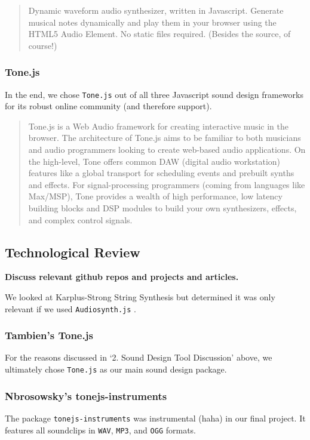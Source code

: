 \documentclass[12pt,a4paper]{article}
\newcommand{\code}{\texttt}
\newcommand{\lightcode}[1]{\colorbox{light-gray}{\texttt{#1}}}
\begin{document}
\begin{quote}
Dynamic waveform audio synthesizer, written in Javascript. Generate musical notes dynamically and play them in your browser using the HTML5 Audio Element. No static files required. (Besides the source, of course!) \cite{audiosynth}
\end{quote}


\subsubsection{Tone.js}
In the end, we chose \lightcode{Tone.js} out of all three Javascript sound design frameworks for its robust online community (and therefore support).

\begin{quote}
Tone.js is a Web Audio framework for creating interactive music in the browser. The architecture of Tone.js aims to be familiar to both musicians and audio programmers looking to create web-based audio applications. On the high-level, Tone offers common DAW (digital audio workstation) features like a global transport for scheduling events and prebuilt synths and effects. For signal-processing programmers (coming from languages like Max/MSP), Tone provides a wealth of high performance, low latency building blocks and DSP modules to build your own synthesizers, effects, and complex control signals. \cite{tonejs}
\end{quote}

\subsection{Technological Review}
\textbf{Discuss relevant github repos and projects and articles.}

We looked at Karplus-Strong String Synthesis but determined it was only relevant if we used \lightcode{Audiosynth.js} \cite{karplus-strong}.

\subsubsection{Tambien's Tone.js}
For the reasons discussed in `2. Sound Design Tool Discussion' above, we ultimately chose \lightcode{Tone.js} as our main sound design package.

\subsubsection{Nbrosowsky's tonejs-instruments}
The package \lightcode{tonejs-instruments} was instrumental (haha) in our final project. It features all soundclips in \code{WAV}, \code{MP3}, and \code{OGG} formats.
\end{document}

